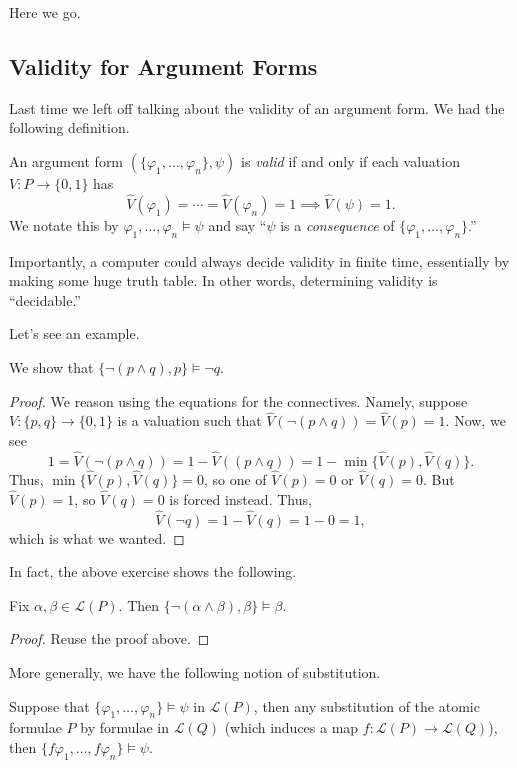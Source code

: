 \documentclass[../notes.tex]{subfiles}
\begin{document}

Here we go.

\subsection{Validity for Argument Forms}
Last time we left off talking about the validity of an argument form. We had the following definition.
\begin{definition}[Valid]
	An argument form $(\{\varphi_1,\ldots,\varphi_n\},\psi)$ is \textit{valid} if and only if each valuation $V:P\to\{0,1\}$ has
	\[\hat V(\varphi_1)=\cdots=\hat V(\varphi_n)=1\implies\hat V(\psi)=1.\]
	We notate this by $\varphi_1,\ldots,\varphi_n\models\psi$ and say ``$\psi$ is a \textit{consequence} of $\{\varphi_1,\ldots,\varphi_n\}$.''
\end{definition}
\begin{remark}
	Importantly, a computer could always decide validity in finite time, essentially by making some huge truth table. In other words, determining validity is ``decidable.''
\end{remark}
Let's see an example.
\begin{exe}
	We show that $\{\lnot(p\land q),p\}\models\lnot q$.
\end{exe}
\begin{proof}
	We reason using the equations for the connectives. Namely, suppose $V:\{p,q\}\to\{0,1\}$ is a valuation such that $\hat V(\lnot(p\land q))=\hat V(p)=1$. Now, we see
	\[1=\hat V(\lnot(p\land q))=1-\hat V((p\land q))=1-\min\{\hat V(p),\hat V(q)\}.\]
	Thus, $\min\{\hat V(p),\hat V(q)\}=0$, so one of $\hat V(p)=0$ or $\hat V(q)=0$. But $\hat V(p)=1$, so $\hat V(q)=0$ is forced instead. Thus,
	\[\hat V(\lnot q)=1-\hat V(q)=1-0=1,\]
	which is what we wanted.
\end{proof}
In fact, the above exercise shows the following.
\begin{proposition} \label{prop:easysub}
	Fix $\alpha,\beta\in\mathcal L(P)$. Then $\{\lnot(\alpha\land\beta),\beta\}\models\beta$.
\end{proposition}
\begin{proof}
	Reuse the proof above.
\end{proof}
More generally, we have the following notion of substitution.
\begin{proposition}[Substitution]
	Suppose that $\{\varphi_1,\ldots,\varphi_n\}\models\psi$ in $\mathcal L(P)$, then any substitution of the atomic formulae $P$ by formulae in $\mathcal L(Q)$ (which induces a map $f:\mathcal L(P)\to\mathcal L(Q)$), then $\{f\varphi_1,\ldots,f\varphi_n\}\models\psi$.
\end{proposition}
\end{document}
